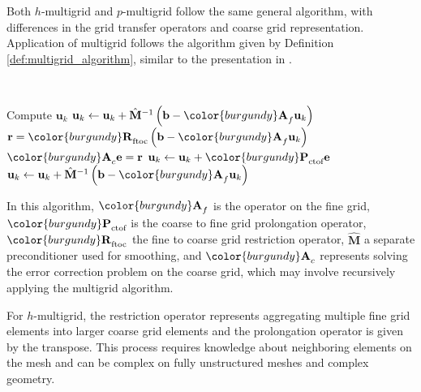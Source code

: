 Both $h$-multigrid and $p$-multigrid follow the same general algorithm, with differences in the grid transfer operators and coarse grid representation.
Application of multigrid follows the algorithm given by Definition \ref{def:multigrid_algorithm}, similar to the presentation in \cite{brandt1982guide}.
\begin{definition}\label{def:multigrid_algorithm}
~\\
\begin{algorithmic}[1]
\State Compute $\mathbf{u}_k$
\State $\mathbf{u}_k \gets \mathbf{u}_k + \hat{\mathbf{M}}^{-1} \left( \mathbf{b} - {\color{burgundy}\mathbf{A}}_f \mathbf{u}_k \right)$ 
\State $\mathbf{r} = {\color{burgundy}\mathbf{R}}_{\text{ftoc}} \left( \mathbf{b} - {\color{burgundy}\mathbf{A}}_f \mathbf{u}_k \right)$ 
\State ${\color{burgundy}\mathbf{A}}_c \mathbf{e} = \mathbf{r}$                                                                          
\State $\mathbf{u}_k \gets \mathbf{u}_k + {\color{burgundy}\mathbf{P}}_{\text{ctof}} \mathbf{e}$                                         
\State $\mathbf{u}_k \gets \mathbf{u}_k + \hat{\mathbf{M}}^{-1} \left( \mathbf{b} - {\color{burgundy}\mathbf{A}}_f \mathbf{u}_k \right)$ 
\end{algorithmic}
\end{definition}
In this algorithm, ${\color{burgundy}\mathbf{A}}_f$ is the operator on the fine grid, ${\color{burgundy}\mathbf{P}}_{\text{ctof}}$ is the coarse to fine grid prolongation operator, ${\color{burgundy}\mathbf{R}}_{\text{ftoc}}$ the fine to coarse grid restriction operator, $\hat{\mathbf{M}}$ a separate preconditioner used for smoothing, and ${\color{burgundy}\mathbf{A}}_c$ represents solving the error correction problem on the coarse grid, which may involve recursively applying the multigrid algorithm.

For $h$-multigrid, the restriction operator represents aggregating multiple fine grid elements into larger coarse grid elements and the prolongation operator is given by the transpose.
This process requires knowledge about neighboring elements on the mesh and can be complex on fully unstructured meshes and complex geometry.

